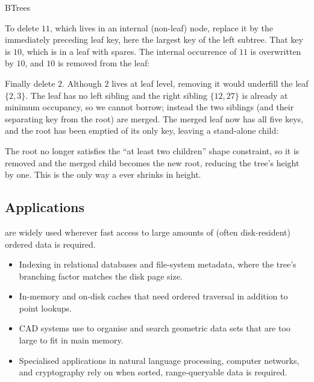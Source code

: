 \documentclass[hidelinks]{article}
\begin{document}
\begin{smodule}[title={B-Trees}]{BTrees}
\begin{example}
To delete $11$, which lives in an internal (non-leaf) node, replace it by the immediately preceding leaf key, here the largest key of the left subtree. That key is $10$, which is in a leaf with spares. The internal occurrence of $11$ is overwritten by $10$, and $10$ is removed from the leaf:
\begin{center}
\end{center}
\end{example}

\begin{example}
Finally delete $2$. Although $2$ lives at leaf level, removing it would underfill the leaf $\{2,3\}$. The leaf has no left sibling and the right sibling $\{12,27\}$ is already at minimum occupancy, so we cannot borrow; instead the two siblings (and their separating key from the root) are merged. The merged leaf now has all five keys, and the root has been emptied of its only key, leaving a stand-alone child:
\begin{center}
\end{center}
The root no longer satisfies the ``at least two children'' shape constraint, so it is removed and the merged child becomes the new root, reducing the tree's height by one. This is the only way a  ever shrinks in height.
\end{example}

\subsection{Applications}

 are widely used wherever fast access to large amounts of (often disk-resident) ordered data is required.
\begin{itemize}
  \item Indexing in relational databases and file-system metadata, where the tree's branching factor matches the disk page size.
  \item In-memory and on-disk caches that need ordered traversal in addition to point lookups.
  \item CAD systems use  to organise and search geometric data sets that are too large to fit in main memory.
  \item Specialised applications in natural language processing, computer networks, and cryptography rely on  when sorted, range-queryable data is required.
\end{itemize}


\end{smodule}
\end{document}
